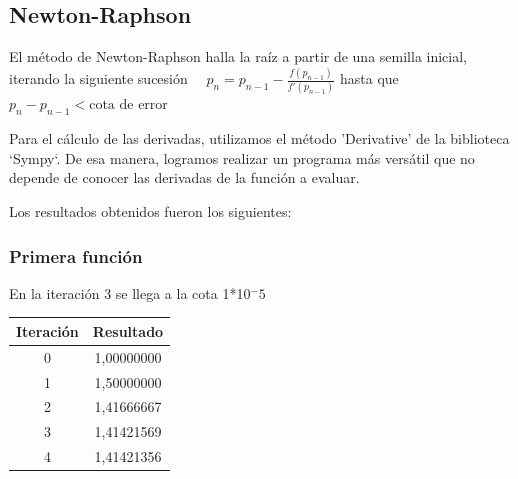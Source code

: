 \documentclass[titlepage,a4paper]{article}
\begin{document}
\subsection{Newton-Raphson}\label{sec:NewtonRaphson}
El método de Newton-Raphson halla la raíz a partir de una semilla inicial, iterando la siguiente sucesión
$\quad p_{n} =p_{n-1}-\frac{f (p_{n-1})}{f'(p_{n-1})}$ hasta que 
$p_{n}-p_{n-1} < \mbox{cota de error}$


Para el cálculo de las derivadas, utilizamos el método 'Derivative' de la biblioteca `Sympy`. De esa manera, logramos realizar un programa más versátil que no depende de conocer las derivadas de la función a evaluar.

Los resultados obtenidos fueron los siguientes:

\subsubsection{Primera función}\label{sec:NR1}
En la iteración 3 se llega a la cota 1*10$^-5$
\begin{center}
\begin{tabular}{| c | c |}
\hline
 Iteración & Resultado \\ \hline
    0     & 1,00000000 \\
    1     & 1,50000000 \\
    2     & 1,41666667 \\
    3     & 1,41421569 \\
    4     & 1,41421356 \\
\hline
\end{tabular}
\end{center}
\end{document}
